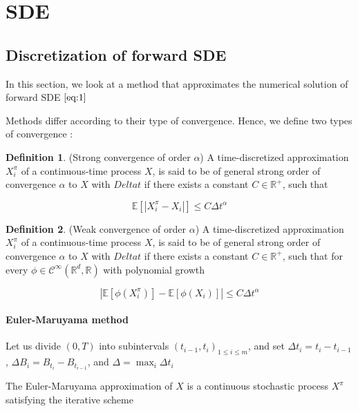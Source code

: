 \documentclass[english,11pt,openany]{article}
\theoremstyle{definition}
\newtheorem{defn}{Definition}[section]
\newcommand{\E}{\mathbb{E}}
\newcommand{\R}{\mathbb{R}}
\theoremstyle{plain}
\theoremstyle{definition}
\begin{document}
	
	
	\newpage
	
	\section{SDE}
	
	\subsection{Discretization of forward SDE}
	
	
	In this section, we look at a method that approximates the numerical solution of forward SDE $\ref{eq:1}$
	
	Methods differ according to their type of convergence. Hence, we define two types of convergence : 
	
	\begin{defn}
		(Strong convergence of order $\alpha$)
		A time-discretized approximation $X_i^\pi$ of a continuous-time process $X$, is said to be of general strong order of convergence $\alpha$ to $X$ with $Delta t$ if there exists a constant $C\in\mathbb{R^+}$, such that
		
		$$ \E[|X_i^\pi - X_i|] \leq C \Delta t^\alpha $$
		
		
	\end{defn}
	
	\begin{defn}
		(Weak convergence of order $\alpha$)
		A time-discretized approximation $X_i^\pi$ of a continuous-time process $X$, is said to be of general strong order of convergence $\alpha$ to $X$ with $Delta t$ if there exists a constant $C\in\mathbb{R^+}$, such that for every $\phi \in \mathcal{C}^\infty(\R^d, \R)$ with polynomial growth
		
		$$ |\E[\phi(X_i^\pi)] - \E[\phi(X_i)]| \leq C \Delta t^\alpha $$
		
	\end{defn}
	
	
	\paragraph{Euler-Maruyama method}
	
	Let us divide $(0,T)$ into subintervals $(t_{i - 1}, t_i)_{1 \leq i \leq m}$, and set $\Delta t_i = t_i - t_{i - 1}$, $\Delta B_i = B_{t_i} - B_{t_{i - 1}} $, and $\Delta = \max_i \Delta t_i$
	
	The Euler-Maruyama approximation of $X$ is a continuous stochastic process $X^\pi$ satisfying the iterative scheme
	
\end{document}

